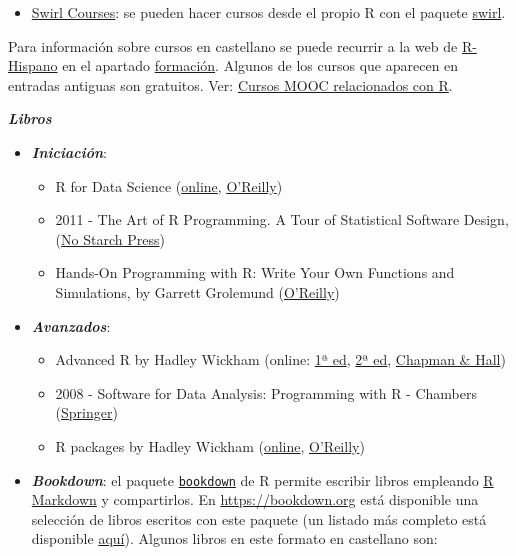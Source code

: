 \documentclass[]{book}
\providecommand{\tightlist}{%
  \setlength{\itemsep}{0pt}\setlength{\parskip}{0pt}}
\begin{document}
\begin{itemize}
\tightlist
\item
  \href{https://swirlstats.com/scn/title.html}{Swirl Courses}: se pueden
  hacer cursos desde el propio R con el paquete
  \href{https://swirlstats.com}{swirl}.
\end{itemize}

Para información sobre cursos en castellano se puede recurrir a la web
de \href{http://r-es.org/}{R-Hispano} en el apartado
\href{http://r-es.org/category/formacion}{formación}. Algunos de los
cursos que aparecen en entradas antiguas son gratuitos. Ver:
\href{http://r-es.org/2016/02/12/cursos-masivos-y-otra-formacion-on-line-sobre-r/}{Cursos
MOOC relacionados con R}.

\textbf{\emph{Libros}}

\begin{itemize}
\item
  \textbf{\emph{Iniciación}}:

  \begin{itemize}
  \item
    R for Data Science (\href{http://r4ds.had.co.nz/}{online},
    \href{http://shop.oreilly.com/product/0636920034407.do}{O'Reilly})
  \item
    2011 - The Art of R Programming. A Tour of Statistical Software
    Design, (\href{https://www.nostarch.com/artofr.htm}{No Starch
    Press})
  \item
    Hands-On Programming with R: Write Your Own Functions and
    Simulations, by Garrett Grolemund
    (\href{http://shop.oreilly.com/product/0636920028574.do}{O'Reilly})
  \end{itemize}
\item
  \textbf{\emph{Avanzados}}:

  \begin{itemize}
  \item
    Advanced R by Hadley Wickham (online:
    \href{http://adv-r.had.co.nz/}{1ª ed},
    \href{https://adv-r.hadley.nz/}{2ª ed},
    \href{https://www.amazon.com/dp/1466586966}{Chapman \& Hall})
  \item
    2008 - Software for Data Analysis: Programming with R - Chambers
    (\href{http://www.springer.com/la/book/9780387759357}{Springer})
  \item
    R packages by Hadley Wickham
    (\href{http://r-pkgs.had.co.nz/}{online},
    \href{http://shop.oreilly.com/product/0636920034421.do}{O'Reilly})
  \end{itemize}
\item
  \textbf{\emph{Bookdown}}: el paquete
  \href{https://bookdown.org}{\texttt{bookdown}} de R permite escribir
  libros empleando \href{http://rmarkdown.rstudio.com}{R Markdown} y
  compartirlos. En \url{https://bookdown.org} está disponible una
  selección de libros escritos con este paquete (un listado más completo
  está disponible \href{https://bookdown.org/home/archive/}{aquí}).
  Algunos libros en este formato en castellano son:


\end{itemize}
\end{document}
